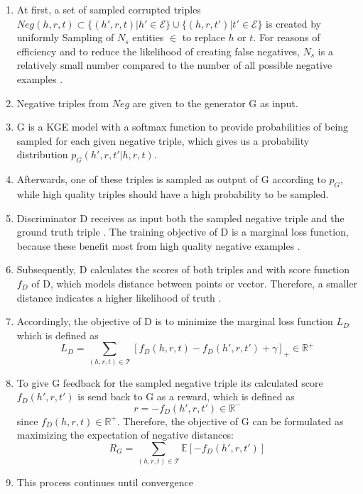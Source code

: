 \begin{enumerate}
    \item 
    At first, a set of sampled corrupted triples $Neg(h,r,t)\subset\{(h',r,t)|h'\in\mathcal{E}\}\cup\{(h,r,t')|t'\in\mathcal{E}\}$ is created by uniformly Sampling of $N_s$ entities $\in$ \entities to replace $h$ or $t$.
    For reasons of efficiency and to reduce the likelihood of creating false negatives, $N_s$ is a relatively small number compared to the number of all possible negative examples \cite{cai2017kbgan}.
    
    \item 
    Negative triples from $Neg$ are given to the generator G as input.
    
    \item 
    G is a \ac{KGE} model with a softmax function to provide  probabilities of being sampled for each given negative triple, which gives us a probability distribution $p_G(h',r,t'|h,r,t)$.

    \item 
    Afterwards, one of these triples is sampled as output of G according to $p_G$, while high quality triples should have a high probability to be sampled.
    
    \item 
    Discriminator D receives as input both the sampled negative triple  and the ground truth triple .
    The training objective of D is a marginal loss function, because these benefit most from high quality negative examples \cite{cai2017kbgan}.

    \item 
    Subsequently, D calculates the scores of both triples  and  with score function $f_D$ of D, which models distance between points or vector.
    Therefore, a smaller distance indicates a higher likelihood of truth \cite{cai2017kbgan}.
    
    \item 
    Accordingly, the objective of D is to minimize the marginal loss function $L_D$ which is defined as
    \begin{equation}
        L_D=\sum_{(h,r,t)\in\mathcal{T}}[f_D(h,r,t)-f_D(h',r,t')+\gamma]_+ \in \mathbb{R}^+
    \end{equation}
    
    \item 
    To give G feedback for the sampled negative triple  its calculated score $f_D(h',r,t')$ is send back to G as a reward, which is defined as
    \begin{equation}
        r = -f_D(h',r,t') \in \mathbb{R}^-
    \end{equation}
    since $f_D(h,r,t) \in \mathbb{R}^+$.
    Therefore, the objective of G can be formulated as maximizing the expectation of negative distances:
    \begin{equation}
        R_G=\sum_{(h,r,t)\in\mathcal{T}}\mathbb{E}[-f_D(h',r,t')]
    \end{equation}
    
    \item
    This process continues until convergence
\end{enumerate}
